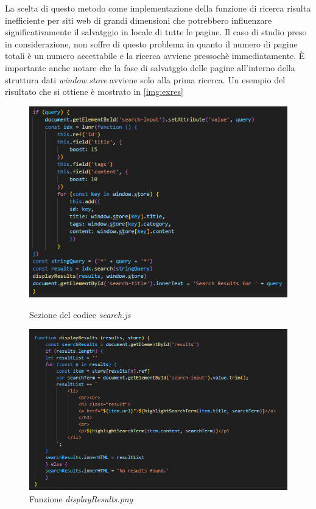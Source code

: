 \documentclass[target=bach,aauheader=]{thud}
\begin{document}
La scelta di questo metodo come implementazione della funzione di ricerca risulta inefficiente per siti web di grandi dimensioni che potrebbero influenzare significativamente il salvatggio in locale di tutte le pagine. 
\newline
Il caso di studio preso in considerazione, non soffre di questo problema in quanto il numero di pagine totali è un numero accettabile e la ricerca avviene pressochè immediatamente. 
\newline
È importante anche notare che la fase di salvatggio delle pagine all'interno della struttura dati \textit{window.store} avviene solo alla prima ricerca. 
\newline 
Un esempio del risultato che si ottiene è mostrato in \cref{img:exres}
\begin{figure}
    \begin{minipage}{0.5\textwidth}
      \centering
      \includegraphics[width=1\textwidth]{images/if-part.png}
      \caption{Sezione del codice \textit{search.js}}
      \label{img:ifpart}
    \end{minipage}
    \begin{minipage}{0.5\textwidth}
      \centering
      \includegraphics[width=1.18\textwidth]{images/displayResults.png}
      \caption{Funzione \textit{displayResults.png}}
      \label{img:results}
    \end{minipage}
\end{figure}
\end{document}
